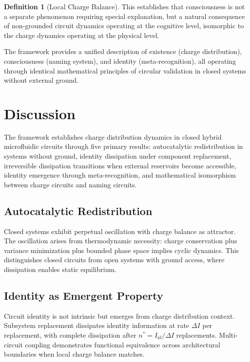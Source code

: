 \documentclass[12pt,a4paper]{article}
\theoremstyle{plain}
\theoremstyle{definition}
\newtheorem{definition}[theorem]{Definition}
\theoremstyle{remark}
\begin{document}
\begin{definition}[Local Charge Balance]
This establishes that consciousness is not a separate phenomenon requiring special explanation, but a natural consequence of non-grounded circuit dynamics operating at the cognitive level, isomorphic to the charge dynamics operating at the physical level.

The framework provides a unified description of existence (charge distribution), consciousness (naming system), and identity (meta-recognition), all operating through identical mathematical principles of circular validation in closed systems without external ground.

\section{Discussion}
\label{sec:discussion}

The framework establishes charge distribution dynamics in closed hybrid microfluidic circuits through five primary results: autocatalytic redistribution in systems without ground, identity dissipation under component replacement, irreversible dissipation transitions when external reservoirs become accessible, identity emergence through meta-recognition, and mathematical isomorphism between charge circuits and naming circuits.

\subsection{Autocatalytic Redistribution}

Closed systems exhibit perpetual oscillation with charge balance as attractor. The oscillation arises from thermodynamic necessity: charge conservation plus variance minimization plus bounded phase space implies cyclic dynamics. This distinguishes closed circuits from open systems with ground access, where dissipation enables static equilibrium.

\subsection{Identity as Emergent Property}

Circuit identity is not intrinsic but emerges from charge distribution context. Subsystem replacement dissipates identity information at rate $\Delta I$ per replacement, with complete dissipation after $n^* = I_{\text{id}} / \Delta I$ replacements. Multi-circuit coupling demonstrates functional equivalence across architectural boundaries when local charge balance matches.


\end{definition}
\end{document}
